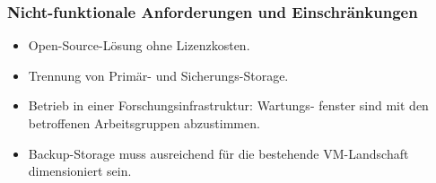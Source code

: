\subsubsection*{Nicht-funktionale Anforderungen und Einschränkungen}
\begin{itemize}
    \item Open-Source-Lösung ohne Lizenzkosten.
    \item Trennung von Primär- und Sicherungs-Storage.
    \item Betrieb in einer Forschungsinfrastruktur: Wartungs-
          fenster sind mit den betroffenen Arbeitsgruppen
          abzustimmen.
    \item Backup-Storage muss ausreichend für die bestehende
          \ac{VM}-Landschaft dimensioniert sein.
\end{itemize}
